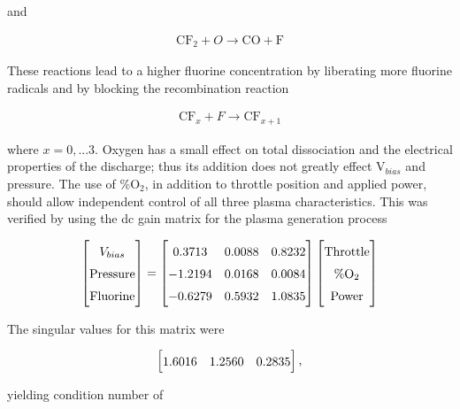 \noindent and

\begin{align}
	\text{CF}_{2} + O \rightarrow \text{CO} +\text{F}
\end{align}

\noindent These reactions lead to a higher fluorine concentration by liberating more fluorine radicals and by blocking the recombination reaction

\begin{align}
	\text{CF}_{x} + F \rightarrow \text{CF}_{x+1}
\end{align}

\noindent where $x = {0 ,...3 }$. Oxygen has a small effect on total dissociation and the electrical properties of the discharge; thus its addition does not greatly effect $\text{V}_{bias}$ and pressure. The use of \%$\text{O}_{2}$, in addition to throttle position and applied power, should allow independent control of all three plasma characteristics. This was verified by using the dc gain matrix for the plasma generation process

\begin{align}
	\renewcommand\arraystretch{1.5} \begin{bmatrix}
		V_{bias} \\ \text{Pressure} \\ \text{Fluorine}
	\end{bmatrix} = 
	\renewcommand\arraystretch{1.5} \begin{bmatrix}
		0.3713 & 0.0088 & 0.8232 \\ -1.2194 & 0.0168 & 0.0084 \\ -0.6279 & 0.5932 & 1.0835
	\end{bmatrix}
	\renewcommand\arraystretch{1.5} \begin{bmatrix}
		\text{Throttle} \\ \text{\%O}_{2} \\ \text{Power}
	\end{bmatrix}
\end{align}

\noindent The singular values for this matrix were

\begin{align}
	\renewcommand\arraystretch{1.5} \begin{bmatrix}
		1.6016 & 1.2560 & 0.2835
	\end{bmatrix},
\end{align}

\noindent yielding condition number of

